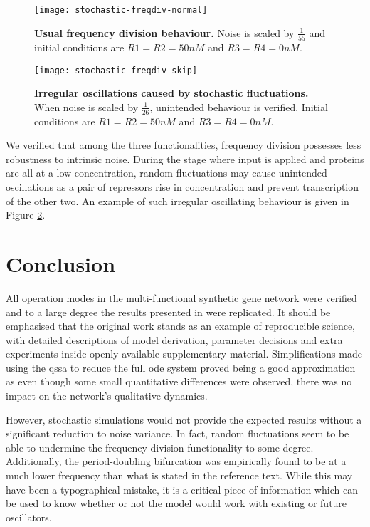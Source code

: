     \begin{figure}[!ht]
      \centering
      \texttt{[image: stochastic-freqdiv-normal]}
      \caption{\textbf{Usual frequency division behaviour.} Noise is scaled by $\frac{1}{55}$ and initial conditions are $R1 = R2 = 50nM$ and $R3 = R4 = 0nM$.}
      \label{fig.stochastic-freqdiv-normal}
    \end{figure}
    \begin{figure}[!hb]
      \centering
      \texttt{[image: stochastic-freqdiv-skip]}
      \caption{\textbf{Irregular oscillations caused by stochastic fluctuations.} When noise is scaled by $\frac{1}{26}$, unintended behaviour is verified. Initial conditions are $R1 = R2 = 50nM$ and $R3 = R4 = 0nM$.}
      \label{fig.stochastic-freqdiv-skip}
    \end{figure}

    We verified that among the three functionalities, frequency division possesses less robustness to intrinsic noise.
    During the stage where input is applied and proteins are all at a low concentration, random fluctuations may cause unintended oscillations as a pair of repressors rise in concentration and prevent transcription of the other two.
    An example of such irregular oscillating behaviour is given in Figure \ref{fig.stochastic-freqdiv-skip}.


\section{Conclusion}

  All operation modes in the multi-functional synthetic gene network were verified and to a large degree the results presented in \cite{originals} were replicated.
  It should be emphasised that the original work stands as an example of reproducible science, with detailed descriptions of model derivation, parameter decisions and extra experiments inside openly available supplementary material.
  Simplifications made using the \ac{qssa} to reduce the full \ac{ode} system proved being a good approximation as even though some small quantitative differences were observed, there was no impact on the network's qualitative dynamics.

  However, stochastic simulations would not provide the expected results without a significant reduction to noise variance.
  In fact, random fluctuations seem to be able to undermine the frequency division functionality to some degree.
  Additionally, the period-doubling bifurcation was empirically found to be at a much lower frequency than what is stated in the reference text.
  While this may have been a typographical mistake, it is a critical piece of information which can be used to know whether or not the model would work with existing or future oscillators.

